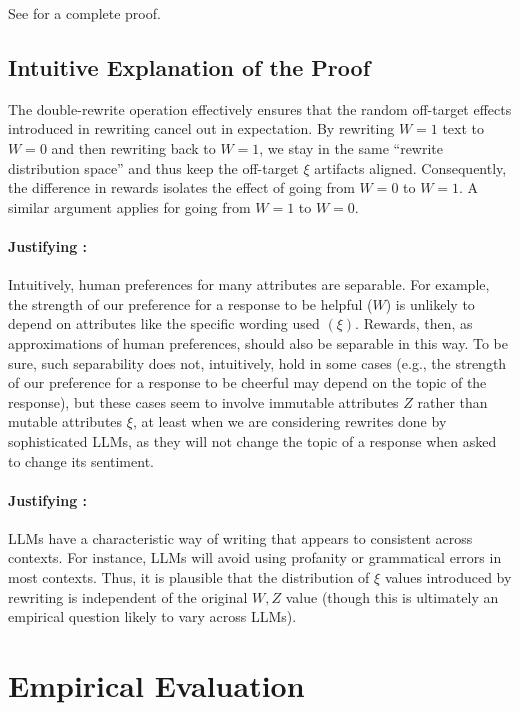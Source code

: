 \documentclass{article}
\theoremstyle{definition}
\begin{document}
See  for a complete proof.

\subsection{Intuitive Explanation of the Proof}
The double-rewrite operation effectively ensures that the random off-target effects introduced in rewriting cancel out in expectation. By rewriting $W=1$ text to $W=0$ and then rewriting back to $W=1$, we stay in the same ``rewrite distribution space'' and thus keep the off-target $\xi$ artifacts aligned. Consequently, the difference in rewards isolates the effect of going from $W=0$ to $W=1$. A similar argument applies for going from $W=1$ to $W=0$. 

\paragraph{Justifying :} Intuitively, human preferences for many attributes are separable. For example, the strength of our preference for a response to be helpful ($W$) is unlikely to depend on attributes like the specific wording used $(\xi)$. Rewards, then, as approximations of human preferences, should also be separable in this way. To be sure, such separability does not, intuitively, hold in some cases (e.g., the strength of our preference for a response to be cheerful may depend on the topic of the response), but these cases seem to involve immutable attributes $Z$ rather than mutable attributes $\xi$, at least when we are considering rewrites done by sophisticated LLMs, as they will not change the topic of a response when asked to change its sentiment.

\paragraph{Justifying :} LLMs have a characteristic way of writing that appears to consistent across contexts. For instance, LLMs will avoid using profanity or grammatical errors in most contexts. Thus, it is plausible that the distribution of $\xi$ values introduced by rewriting is independent of the original $W, Z$ value (though this is ultimately an empirical question likely to vary across LLMs).

\section{Empirical Evaluation}
\label{sec:experiments}
\end{document}
